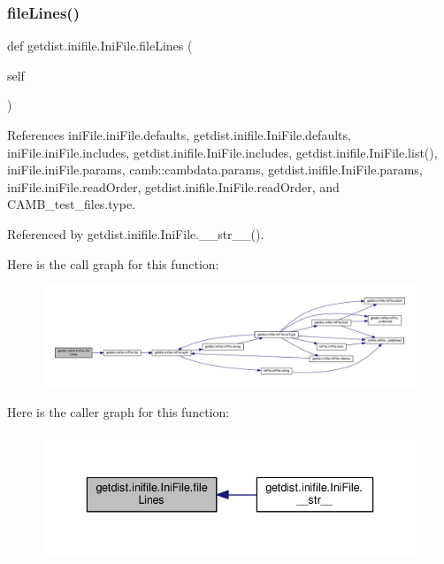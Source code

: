 \subsubsection{\texorpdfstring{file\+Lines()}{fileLines()}}
{\footnotesize\ttfamily def getdist.\+inifile.\+Ini\+File.\+file\+Lines (\begin{DoxyParamCaption}\item[{}]{self }\end{DoxyParamCaption})}



References ini\+File.\+ini\+File.\+defaults, getdist.\+inifile.\+Ini\+File.\+defaults, ini\+File.\+ini\+File.\+includes, getdist.\+inifile.\+Ini\+File.\+includes, getdist.\+inifile.\+Ini\+File.\+list(), ini\+File.\+ini\+File.\+params, camb\+::cambdata.\+params, getdist.\+inifile.\+Ini\+File.\+params, ini\+File.\+ini\+File.\+read\+Order, getdist.\+inifile.\+Ini\+File.\+read\+Order, and C\+A\+M\+B\+\_\+test\+\_\+files.\+type.



Referenced by getdist.\+inifile.\+Ini\+File.\+\_\+\+\_\+str\+\_\+\+\_\+().

Here is the call graph for this function\+:
\nopagebreak
\begin{figure}[H]
\begin{center}
\leavevmode
\includegraphics[width=350pt]{classgetdist_1_1inifile_1_1IniFile_a10320a346d83ec496b1f5afc243381c6_cgraph}
\end{center}
\end{figure}
Here is the caller graph for this function\+:
\nopagebreak
\begin{figure}[H]
\begin{center}
\leavevmode
\includegraphics[width=336pt]{classgetdist_1_1inifile_1_1IniFile_a10320a346d83ec496b1f5afc243381c6_icgraph}
\end{center}
\end{figure}
\mbox{\label{classgetdist_1_1inifile_1_1IniFile_ae6d8dedd31b32977a6a1340e6bbcf04f}} 

